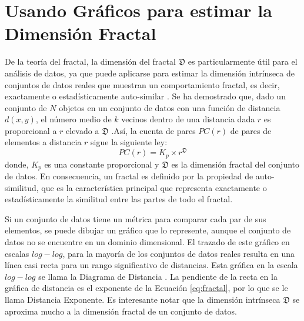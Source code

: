 \section{Usando Gráficos  para estimar la Dimensión Fractal}

  De la teoría del fractal, la dimensión del fractal $\mathfrak{D}$ es particularmente útil para el análisis de datos, ya que puede aplicarse para estimar la dimensión intrínseca de conjuntos de datos reales que muestran un comportamiento fractal, es decir, exactamente o estadísticamente auto-similar \cite{Belussi:1995:ESS:645921.673166}. Se ha demostrado que, dado un conjunto de $N$ objetos en un conjunto de datos con una función de distancia $d(x,y)$, el número medio de $k$ vecinos dentro de una distancia dada $r$ es proporcional a $r$ elevado a $\mathfrak{D}$  \cite{Arantes_thefractal}.Así, la cuenta de pares $PC(r)$ de pares de elementos a distancia $r$ sigue la siguiente ley:
\begin{equation}\label{eq:fractal}
	   PC(r) = K_p \times r^{\mathfrak{D}}		
	\end{equation}
donde, $K_p$ es una constante proporcional  y $\mathfrak{D}$ es la dimensión fractal del conjunto de datos.     En consecuencia, un fractal es definido por la propiedad de auto-similitud, que es la característica principal que representa exactamente o estadísticamente la similitud entre las partes de todo el fractal.  

Si un conjunto de datos tiene un métrica para comparar cada par de sus elementos, se  puede dibujar un gráfico que lo represente, aunque el conjunto de datos no se encuentre en un dominio dimensional.  El trazado de este gráfico en escalas $log-log$, para la mayoría de los conjuntos de datos reales resulta en una línea casi recta para un rango significativo de distancias. Esta gráfica en la escala $log-log$   se llama la Diagrama de Distancia \cite{traina1999distance}. La pendiente de la recta en la gráfica de distancia es el exponente de la Ecuación \ref{eq:fractal}, por lo que se le llama Distancia Exponente. Es interesante notar que la dimensión intrínseca $\mathfrak{D}$ se aproxima mucho a la dimensión fractal  de un conjunto de datos.

